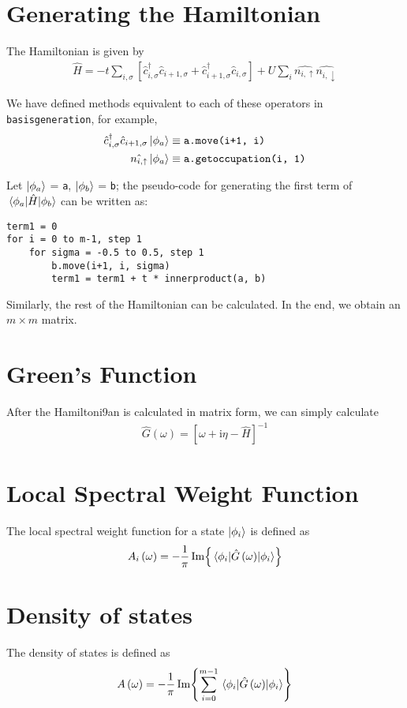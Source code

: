 \documentclass[]{book}
\begin{document}
\section{Generating the Hamiltonian}
The Hamiltonian is given by
\begin{align}
\hat{H} = -t \sum_{i, \sigma} \left[ \hat{c}^{\dagger}_{i, \sigma} \hat{c}_{i+1, \sigma} + \hat{c}^{\dagger}_{i+1, \sigma} \hat{c}_{i, \sigma} \right] + U \sum_{i} \hat{n_{i, \uparrow}} \hat{n_{i, \downarrow}}
\end{align}

We have defined methods equivalent to each of these operators in \texttt{basisgeneration}, for example,
\begin{align}
\hat{c}^{\dagger}_{i, \sigma} \hat{c}_{i+1, \sigma} \ket{\phi_a} &\equiv \texttt{a.move(i+1, i)}\\
\hat{n_{i, \uparrow}} \ket{\phi_a}  &\equiv \texttt{a.getoccupation(i, 1)}
\end{align}


Let $ \ket{\phi_a} $ = \texttt{a}, $ \ket{\phi_b} $ = \texttt{b}; the pseudo-code for generating the first term of $ \mel{\phi_a}{\hat{H}}{\phi_b} $ can be written as:
\begin{verbatim}
term1 = 0
for i = 0 to m-1, step 1
    for sigma = -0.5 to 0.5, step 1
        b.move(i+1, i, sigma)
        term1 = term1 + t * innerproduct(a, b)
\end{verbatim}
Similarly, the rest of the Hamiltonian can be calculated. In the end, we obtain an $m \times m$ matrix.

\section{Green's Function}
After the Hamiltoni9an is calculated in matrix form, we can simply calculate
\begin{align}
\hat{G} \left( \omega \right) = \left[ \omega + \mathrm{i}\eta - \hat{H} \right]^{-1}
\end{align}

\section{Local Spectral Weight Function}
The local spectral weight function for a state $ \ket{\phi_i} $ is defined as
\begin{align}
A_i \left( \omega \right) = - \frac{1}{\pi} \Im{\mel{\phi_i}{\hat{G} \left( \omega \right) }{\phi_i}}
\end{align}

\section{Density of states}
The density of states is defined as
\begin{align}
A \left( \omega \right) = - \frac{1}{\pi} \Im{\sum_{i = 0}^{m-1}\mel{\phi_i}{\hat{G} \left( \omega \right) }{\phi_i}}
\end{align}
\end{document}
